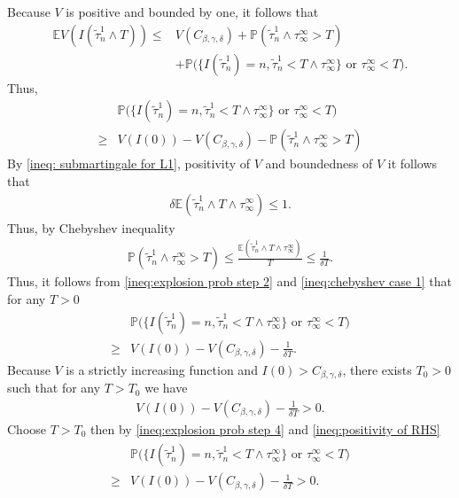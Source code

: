 \documentclass[12pt]{article}
\numberwithin{equation}{section}
\begin{document}
Because $V$ is positive and bounded by one, it follows that
\begin{align}
    \mathbb{E}V(I(\tilde{\tau}^1_n \wedge T)) \leq & V(C_{\beta,\gamma,\delta})+  \mathbb{P}(\tilde{\tau}^1_n\land\tau_\infty^\infty >T) \nonumber\\
    &+ \mathbb{P}\Big(\{I(\tilde{\tau}^1_n) = n,\tilde{\tau}_n^1<T\land\tau_\infty^\infty\} \text{ or } \tau^\infty_\infty <T\Big).\label{ineq:explosion prob step 1}
\end{align}
Thus,
\begin{align}
   &\mathbb{P}\Big(\{I(\tilde{\tau}^1_n) = n,\tilde{\tau}_n^1<T\land\tau_\infty^\infty\} \text{ or } \tau^\infty_\infty <T\Big)\nonumber\\
   \geq & V(I(0)) - V(C_{\beta,\gamma,\delta}) - \mathbb{P}(\tilde{\tau}^1_n\land\tau_\infty^\infty > T)\label{ineq:explosion prob step 2}
\end{align}
By \eqref{ineq: submartingale for L1}, positivity of $V$ and boundedness of $V$ it follows that
\begin{align}
    \delta\mathbb{E}(\tilde{\tau}_n^1\land T\land\tau_\infty^\infty)\leq 1.
\end{align}
Thus, by Chebyshev inequality
\begin{align}
    \mathbb{P}(\tilde{\tau}_n^1\land\tau_\infty^\infty>T)\leq \frac{\mathbb{E}(\tilde{\tau}_n^1\land T\land\tau_\infty^\infty)}{T}\leq \frac{1}{\delta T}.\label{ineq:chebyshev case 1}
\end{align}
Thus, it follows from \eqref{ineq:explosion prob step 2} and \eqref{ineq:chebyshev case 1} that for any $T>0$
\begin{align}
        &\mathbb{P}\Big(\{I(\tilde{\tau}^1_n) = n,\tilde{\tau}_n^1<T\land\tau_\infty^\infty\} \text{ or } \tau^\infty_\infty <T\Big)\nonumber\\
    \geq& V(I(0))-V(C_{\beta,\gamma,\delta})-\frac{1}{\delta T}.\label{ineq:explosion prob step 4}
\end{align}
Because $V$ is a strictly increasing function and $I(0)>C_{\beta,\gamma,\delta}$, there exists $T_0>0$ such that for any $T>T_0$ we have 
\begin{align}
    V(I(0))-V(C_{\beta,\gamma,\delta})-\frac{1}{\delta T}>0.\label{ineq:positivity of RHS}
\end{align}
Choose $T>T_0$ then by \eqref{ineq:explosion prob step 4} and \eqref{ineq:positivity of RHS}
\begin{align}
    \begin{split}
        &\mathbb{P}\Big(\{I(\tilde{\tau}^1_n) = n,\tilde{\tau}_n^1<T\land\tau_\infty^\infty\} \text{ or } \tau^\infty_\infty <T\Big)\\
    \geq &V(I(0))-V(C_{\beta,\gamma,\delta})-\frac{1}{\delta T}>0.
    \end{split}\label{ineq:explosion prob}
\end{align}
\end{document}
